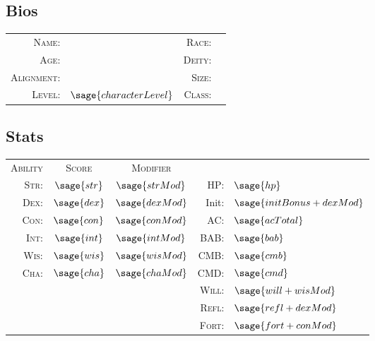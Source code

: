 \documentclass[10pt]{article}
\begin{document}
%
% 

\subsection*{Bios}
	\begin{tabular}{r l r l}
		\textsc{Name:} & \charName & \textsc{Race:} & \charRace \\
		\textsc{Age:} & \charAge & \textsc{Deity:} & \charGod \\
		\textsc{Alignment:} & \charAlign & \textsc{Size:} & \charSize \\
		\textsc{Level:} & \(\sage{characterLevel}\) & \textsc{Class:} & \class
	\end{tabular}

\subsection*{Stats}

	\begin{tabular}{r c c | r l}
		\textsc{Ability} & \textsc{Score} & \textsc{Modifier} && \\
		\textsc{Str:} & \(\sage{str}\) & \(\sage{strMod}\) & HP: & \(\sage{hp}\) \\
		\textsc{Dex:} & \(\sage{dex}\) & \(\sage{dexMod}\) & Init: & \(\sage{initBonus + dexMod}\) \\
		\textsc{Con:} & \(\sage{con}\) & \(\sage{conMod}\) & AC: & \(\sage{acTotal}\) \\
		\textsc{Int:} & \(\sage{int}\) & \(\sage{intMod}\) & BAB: & \(\sage{bab}\) \\
		\textsc{Wis:} & \(\sage{wis}\) & \(\sage{wisMod}\) & CMB: & \(\sage{cmb}\) \\
		\textsc{Cha:} & \(\sage{cha}\) & \(\sage{chaMod}\) & CMD: & \(\sage{cmd}\) \\
		&&& \textsc{Will:} & \(\sage{will + wisMod}\) \\
		&&& \textsc{Refl:} & \(\sage{refl + dexMod}\) \\
		&&& \textsc{Fort:} & \(\sage{fort + conMod}\) \\
	\end{tabular}
\end{document}
